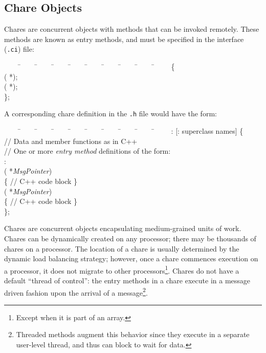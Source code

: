 \subsection{Chare Objects}

Chares are concurrent objects with methods that can be invoked
remotely.  These methods are known as entry methods, and 
must be specified in the interface ({\tt .ci}) file:

\begin{tabbing}
~~~~ \=~~~~ \=~~~~ \=~~~~ \=~~~~ \=~~~~ \=~~~~ \=~~~~ \=~~~~ \=~~~~ \kill
\>   \{ \\
\> \>  ( *); \\
\> \>  ( *); \\
\> \};
\end{tabbing}

A corresponding chare definition in the {\tt .h} file would 
have the form:

\begin{tabbing}
~~~~ \=~~~~ \=~~~~ \=~~~~ \=~~~~ \=~~~~ \=~~~~ \=~~~~ \=~~~~ \=~~~~ \kill
\>   :  [: superclass names] \{ \\
\> \>   // Data and member functions as in C++ \\
\> \>   // One or more {\it entry method} 
definitions of the form: \\
\> : \\
\> \> ( *{\it MsgPointer}) \\
\> \> \> \{ // C++ code block  \} \\
\> \>  ( *{\it MsgPointer}) \\
\> \> \> \{ // C++ code block  \} \\
\> \};
\end{tabbing}

Chares are concurrent objects encapsulating medium-grained units of
work.  Chares can be dynamically created on any processor; there may
be thousands of chares on a processor. The location of a chare is
usually determined by the dynamic load balancing strategy; however,
once a chare commences execution on a processor, it does not migrate
to other processors\footnote{Except when it is part of an array.}.  
Chares do not have a default ``thread of
control'': the entry methods  in a
chare execute in a message driven fashion upon the arrival of a 
message\footnote{Threaded methods augment this behavior since they execute in
a separate user-level thread, and thus can block to wait for data.}.


